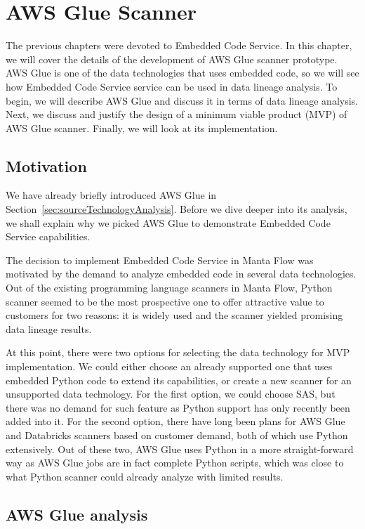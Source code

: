 \chapter{AWS Glue Scanner}

The previous chapters were devoted to Embedded Code Service. In this chapter, we will cover the details of the development of AWS Glue scanner prototype. AWS Glue is one of the data technologies that uses embedded code, so we will see how Embedded Code Service service can be used in data lineage analysis. To begin, we will describe AWS Glue and discuss it in terms of data lineage analysis. Next, we discuss and justify the design of a minimum viable product (MVP) of AWS Glue  scanner. Finally, we will look at its implementation. 

\section{Motivation}

We have already briefly introduced AWS Glue in Section~\ref{sec:sourceTechnologyAnalysis}. Before we dive deeper into its analysis, we shall explain why we picked AWS Glue to demonstrate Embedded Code Service capabilities.
\par
The decision to implement Embedded Code Service in Manta Flow was motivated by the demand to analyze embedded code in several data technologies. Out of the existing programming language scanners in Manta Flow, Python scanner seemed to be the most prospective one to offer attractive value to customers for two reasons: it is widely used and the scanner yielded promising data lineage results.
\par
At this point, there were two options for selecting the data technology for MVP implementation. We could either choose an already supported one that uses embedded Python code to extend its capabilities, or create a new scanner for an unsupported data technology. For the first option, we could choose SAS, but there was no demand for such feature as Python support has only recently been added into it. For the second option, there have long been plans for AWS Glue and Databricks scanners based on customer demand, both of which use Python extensively. Out of these two, AWS Glue uses Python in a more straight-forward way as AWS Glue jobs are in fact complete Python scripts, which was close to what Python scanner could already analyze with limited results.

\section{AWS Glue analysis}

